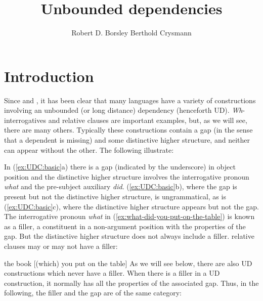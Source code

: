 \documentclass[output=paper
,notxmath 
	        ,collection
	        ,collectionchapter
 	        ,biblatex
                ,babelshorthands
                ,newtxmath
                ,draftmode
                ,colorlinks, citecolor=brown
]{langscibook}
\author{Robert D. Borsley\affiliation{University of Essex and Bangor University}
 \lastand Berthold Crysmann\affiliation{CNRS, Laboratoire de linguistique formelle}
}
\title{Unbounded dependencies}
\begin{document}
\maketitle
\label{chap-udc}


\section{Introduction}
\label{sec:Intro} 

Since \citet{ross_j67} and \citet{Chomsky:77}, it has been clear that many
languages have a variety of constructions involving an unbounded (or
long distance) dependency (henceforth UD). \emph{Wh}-interrogatives
and relative clauses are important examples, but, as we will see,
there are many others. Typically these constructions contain a gap
(in the sense that a dependent is missing) and some distinctive
higher structure, and neither can appear without the other. The
following illustrate:

\eal
\label{ex:UDC:basic}
\zl

\noindent In (\ref{ex:UDC:basic}a) there is a gap (indicated by the
underscore) in object position and the distinctive higher structure
involves the interrogative pronoun \emph{what} and the pre-subject
auxiliary \emph{did}. (\ref{ex:UDC:basic}b), where the gap is
present but not the distinctive higher structure, is ungrammatical,
as is (\ref{ex:UDC:basic}c), where the distinctive higher structure
appears but not the gap.  The interrogative pronoun \textit{what} in
(\ref{ex:what-did-you-put-on-the-table}) is known as a filler, a constituent in a
non-argument position with the properties of the gap.  But the
distinctive higher structure does not always include a filler.
 relative clauses may or may not have a filler:

\ea
\label{ex:UDC:2} 
the book [(which) you put \trace{} on the table]
\z 
\noindent As we will see below, there are also UD constructions which
never have a filler.  When there is a filler in a UD construction, it
normally has all the properties of the associated gap. Thus, in the
following, the filler and the gap are of the same category:

\eal
\label{ex:UDC:3} 
\zl
\end{document}
